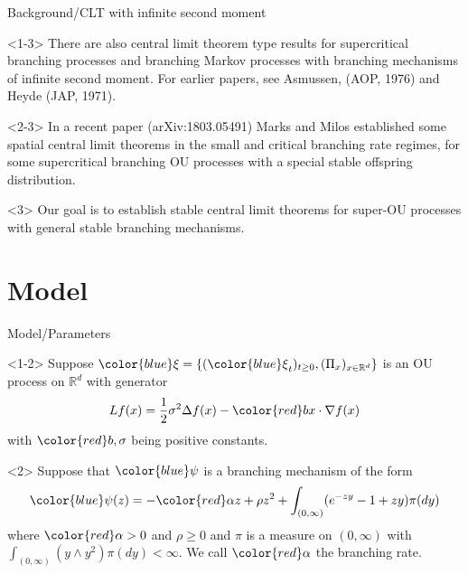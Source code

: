 \documentclass[xcolor=dvipsnames]{beamer}
\begin{document}
\begin{frame}{Background/CLT with infinite second moment}
\begin{block}{}<1-3>
There are also {\color{Bittersweet}central limit theorem} type results for {\color{PineGreen} supercritical} {\color{blue}branching processes}
and {\color{blue} branching Markov processes} with branching mechanisms of {\color{PineGreen} infinite second moment}.
For earlier papers, see Asmussen, (AOP, 1976) and Heyde (JAP, 1971).
\end{block}

\begin{block}{}<2-3>
In a recent paper (arXiv:1803.05491) Marks and Milos established some {\color{Bittersweet}spatial central limit theorems} in the {\color{PineGreen} small and critical branching rate regimes}, for some {\color{PineGreen} supercritical} {\color{blue} branching OU processes} with a {\color{PineGreen} special stable offspring distribution.}
\end{block}

\begin{block}{}<3>
Our {\color{red}goal} is to establish {\color{Bittersweet}stable central limit theorems} for {\color{blue}super-OU processes} with {\color{PineGreen} general stable branching mechanisms.}
\end{block}  
\end{frame}

\section{Model}

\begin{frame}{Model/Parameters}
\begin{block}{}<1-2>
Suppose ${\color{blue}\xi}=\{({\color{blue}\xi}_t)_{t\ge 0}, (\Pi_x)_{x\in \mathbb R^d}\}$ is an OU process on $\mathbb R^d$ with generator
$$
Lf(x)=\frac12\sigma^2\Delta f(x)-{\color{red} b}x\cdot \nabla f(x)
$$
with ${\color{red}b}, \sigma$ being positive constants.
\end{block}

\begin{block}{}<2>
Suppose that ${\color{blue}\psi}$ is a branching mechanism of the form
$$
{\color{blue}\psi} (z)=-{\color{red}\alpha} z + \rho z^2 +\int_{(0, \infty)}(e^{-zy}-1+zy) \pi(dy)
$$
where ${\color{red}\alpha}>0$ and $\rho\ge 0$ and $\pi$ is a measure on $(0, \infty)$ with
$\int_{(0, \infty)}(y\wedge y^2)\pi(dy)<\infty$.
We call ${\color{red}\alpha}$ the branching rate.
\end{block}
\end{frame}
\end{document}
